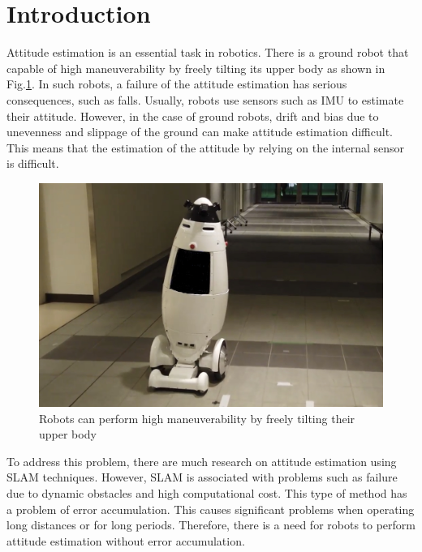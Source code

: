 \section{Introduction}

Attitude estimation is an essential task in robotics. There is a ground robot that capable of high maneuverability by freely tilting its upper body as shown in Fig.\ref{fig:CCV}. In such robots, a failure of the attitude estimation has serious consequences, such as falls. Usually, robots use sensors such as IMU to estimate their attitude. However, in the case of ground robots, drift and bias due to unevenness and slippage of the ground can make attitude estimation difficult\cite{Vaganay1993MobileRA}. This means that the estimation of the attitude by relying on the internal sensor is difficult.

   \begin{figure}[thpb]
      \centering
      \includegraphics[scale=0.13]{./figure/1_introduction/CCV.jpg}
      \caption{Robots can perform high maneuverability by freely
tilting their upper body}
      \label{fig:CCV}
   \end{figure}

To address this problem, there are much research on attitude estimation using SLAM techniques\cite{thrun2005probabilistic}. However, SLAM is associated with problems such as failure due to dynamic obstacles\cite{SLAM_fail} and high computational cost. This type of method has a problem of error accumulation. This causes significant problems when operating long distances or for long periods. Therefore, there is a need for robots to perform attitude estimation without error accumulation. \par
   
